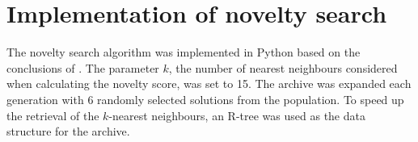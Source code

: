 \section{Implementation of novelty search}
The novelty search algorithm was implemented in Python based on the conclusions of \cite{ns_study}.
The parameter $k$, the number of nearest neighbours considered when calculating the novelty score,
was set to 15. The archive was expanded each generation with $6$ randomly selected
solutions from the population. To speed up the retrieval of the $k$-nearest neighbours, an
R-tree was used as the data structure for the archive.